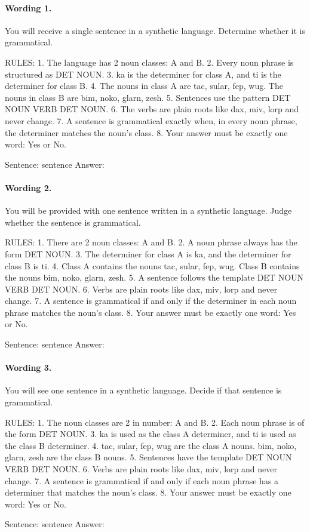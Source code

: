\paragraph{Wording 1.}
\begin{promptbox}
You will receive a single sentence in a synthetic language. Determine whether it is grammatical.

RULES:
1. The language has 2 noun classes: A and B.
2. Every noun phrase is structured as DET NOUN.
3. ka is the determiner for class A, and ti is the determiner for class B.
4. The nouns in class A are tac, sular, fep, wug. The nouns in class B are bim, noko, glarn, zesh.
5. Sentences use the pattern DET NOUN VERB DET NOUN.
6. The verbs are plain roots like dax, miv, lorp and never change.
7. A sentence is grammatical exactly when, in every noun phrase, the determiner matches the noun's class.
8. Your answer must be exactly one word: Yes or No.

Sentence: {sentence}
Answer:
\end{promptbox}

\paragraph{Wording 2.}
\begin{promptbox}
You will be provided with one sentence written in a synthetic language. Judge whether the sentence is grammatical.

RULES:
1. There are 2 noun classes: A and B.
2. A noun phrase always has the form DET NOUN.
3. The determiner for class A is ka, and the determiner for class B is ti.
4. Class A contains the nouns tac, sular, fep, wug. Class B contains the nouns bim, noko, glarn, zesh.
5. A sentence follows the template DET NOUN VERB DET NOUN.
6. Verbs are plain roots like dax, miv, lorp and never change.
7. A sentence is grammatical if and only if the determiner in each noun phrase matches the noun's class.
8. Your answer must be exactly one word: Yes or No.

Sentence: {sentence}
Answer:
\end{promptbox}

\paragraph{Wording 3.}
\begin{promptbox}
You will see one sentence in a synthetic language. Decide if that sentence is grammatical.

RULES:
1. The noun classes are 2 in number: A and B.
2. Each noun phrase is of the form DET NOUN.
3. ka is used as the class A determiner, and ti is used as the class B determiner.
4. tac, sular, fep, wug are the class A nouns. bim, noko, glarn, zesh are the class B nouns.
5. Sentences have the template DET NOUN VERB DET NOUN.
6. Verbs are plain roots like dax, miv, lorp and never change.
7. A sentence is grammatical if and only if each noun phrase has a determiner that matches the noun's class.
8. Your answer must be exactly one word: Yes or No.

Sentence: {sentence}
Answer:
\end{promptbox}

